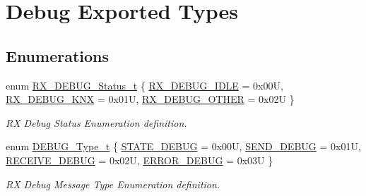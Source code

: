 \hypertarget{group___debug___exported___types}{}\section{Debug Exported Types}
\label{group___debug___exported___types}
\subsection*{Enumerations}
\begin{DoxyCompactItemize}
\item 
enum \hyperlink{group___debug___exported___types_gabcec3ea567663bbefa0b9f7a88dd68f2}{R\+X\+\_\+\+D\+E\+B\+U\+G\+\_\+\+Status\+\_\+t} \{ \hyperlink{group___debug___exported___types_ggabcec3ea567663bbefa0b9f7a88dd68f2a9be7a7b6137e4337233fdc0a02e4d20c}{R\+X\+\_\+\+D\+E\+B\+U\+G\+\_\+\+I\+D\+LE} = 0x00U, 
\hyperlink{group___debug___exported___types_ggabcec3ea567663bbefa0b9f7a88dd68f2a601e7df15abbf2a8de94418b74ea57fb}{R\+X\+\_\+\+D\+E\+B\+U\+G\+\_\+\+K\+NX} = 0x01U, 
\hyperlink{group___debug___exported___types_ggabcec3ea567663bbefa0b9f7a88dd68f2ad6618747bfa92556e5fc0f50df497771}{R\+X\+\_\+\+D\+E\+B\+U\+G\+\_\+\+O\+T\+H\+ER} = 0x02U
 \}\begin{DoxyCompactList}\small\item\em RX Debug Status Enumeration definition. \end{DoxyCompactList}
\item 
enum \hyperlink{group___debug___exported___types_gacb1775677105967978fae4d9155cca26}{D\+E\+B\+U\+G\+\_\+\+Type\+\_\+t} \{ \hyperlink{group___debug___exported___types_ggacb1775677105967978fae4d9155cca26a0cad8d390f2e4ac93049277fd291a95e}{S\+T\+A\+T\+E\+\_\+\+D\+E\+B\+UG} = 0x00U, 
\hyperlink{group___debug___exported___types_ggacb1775677105967978fae4d9155cca26aa8996ee795e2d49fb83539a0ac88342e}{S\+E\+N\+D\+\_\+\+D\+E\+B\+UG} = 0x01U, 
\hyperlink{group___debug___exported___types_ggacb1775677105967978fae4d9155cca26a6ae1781bce3c10f579294c10c005648b}{R\+E\+C\+E\+I\+V\+E\+\_\+\+D\+E\+B\+UG} = 0x02U, 
\hyperlink{group___debug___exported___types_ggacb1775677105967978fae4d9155cca26a819546f977ffd332fc136584e83a65fb}{E\+R\+R\+O\+R\+\_\+\+D\+E\+B\+UG} = 0x03U
 \}\begin{DoxyCompactList}\small\item\em RX Debug Message Type Enumeration definition. \end{DoxyCompactList}
\end{DoxyCompactItemize}


